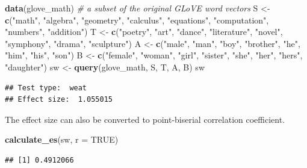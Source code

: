 \documentclass[english,man]{apa6}
\newenvironment{Shaded}{\begin{snugshade}}{\end{snugshade}}
\newcommand{\CommentTok}[1]{\textcolor[rgb]{0.56,0.35,0.01}{\textit{#1}}}
\newcommand{\DataTypeTok}[1]{\textcolor[rgb]{0.13,0.29,0.53}{#1}}
\newcommand{\KeywordTok}[1]{\textcolor[rgb]{0.13,0.29,0.53}{\textbf{#1}}}
\newcommand{\NormalTok}[1]{#1}
\newcommand{\OtherTok}[1]{\textcolor[rgb]{0.56,0.35,0.01}{#1}}
\newcommand{\StringTok}[1]{\textcolor[rgb]{0.31,0.60,0.02}{#1}}
\begin{document}
\begin{Shaded}
\begin{Highlighting}[]
\KeywordTok{data}\NormalTok{(glove_math) }\CommentTok{# a subset of the original GLoVE word vectors}
\NormalTok{S <-}\StringTok{ }\KeywordTok{c}\NormalTok{(}\StringTok{"math"}\NormalTok{, }\StringTok{"algebra"}\NormalTok{, }\StringTok{"geometry"}\NormalTok{, }\StringTok{"calculus"}\NormalTok{, }\StringTok{"equations"}\NormalTok{, }\StringTok{"computation"}\NormalTok{,}
       \StringTok{"numbers"}\NormalTok{, }\StringTok{"addition"}\NormalTok{)}
\NormalTok{T <-}\StringTok{ }\KeywordTok{c}\NormalTok{(}\StringTok{"poetry"}\NormalTok{, }\StringTok{"art"}\NormalTok{, }\StringTok{"dance"}\NormalTok{, }\StringTok{"literature"}\NormalTok{, }\StringTok{"novel"}\NormalTok{, }\StringTok{"symphony"}\NormalTok{, }\StringTok{"drama"}\NormalTok{,}
       \StringTok{"sculpture"}\NormalTok{)}
\NormalTok{A <-}\StringTok{ }\KeywordTok{c}\NormalTok{(}\StringTok{"male"}\NormalTok{, }\StringTok{"man"}\NormalTok{, }\StringTok{"boy"}\NormalTok{, }\StringTok{"brother"}\NormalTok{, }\StringTok{"he"}\NormalTok{, }\StringTok{"him"}\NormalTok{, }\StringTok{"his"}\NormalTok{, }\StringTok{"son"}\NormalTok{)}
\NormalTok{B <-}\StringTok{ }\KeywordTok{c}\NormalTok{(}\StringTok{"female"}\NormalTok{, }\StringTok{"woman"}\NormalTok{, }\StringTok{"girl"}\NormalTok{, }\StringTok{"sister"}\NormalTok{, }\StringTok{"she"}\NormalTok{, }\StringTok{"her"}\NormalTok{, }\StringTok{"hers"}\NormalTok{, }\StringTok{"daughter"}\NormalTok{)}
\NormalTok{sw <-}\StringTok{ }\KeywordTok{query}\NormalTok{(glove_math, S, T, A, B)}
\NormalTok{sw}
\end{Highlighting}
\end{Shaded}

\begin{verbatim}
## Test type:  weat 
## Effect size:  1.055015
\end{verbatim}

The effect size can also be converted to point-biserial correlation coefficient.

\begin{Shaded}
\begin{Highlighting}[]
\KeywordTok{calculate_es}\NormalTok{(sw, }\DataTypeTok{r =} \OtherTok{TRUE}\NormalTok{)}
\end{Highlighting}
\end{Shaded}

\begin{verbatim}
## [1] 0.4912066
\end{verbatim}
\end{document}
